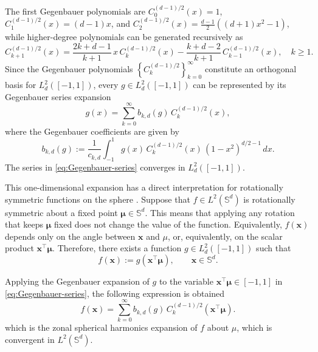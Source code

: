 \documentclass[12pt]{report} %
\newcommand{\bx}{\mathbf{x}}
\newcommand{\bmu}{\boldsymbol{\mu}}
\begin{document}
The first Gegenbauer polynomials are $C_0^{(d-1)/2}(x) = 1$, $C_1^{(d-1)/2}(x) = (d - 1)x$, and $C_2^{(d-1)/2}(x) = \frac{d - 1}{2}\left((d + 1)x^2 - 1\right)$, while higher-degree polynomials can be generated recursively as \citep[Section~18.9]{NIST:DLMF}
\begin{equation*}
C_{k+1}^{(d-1) / 2}(x)=\frac{2 k+d-1}{k+1} 
\, x \, C_k^{(d-1) / 2}(x)-\frac{k+d-2}{k+1} \, C_{k-1}^{(d-1) / 2}(x), \quad k \geq 1 .
\end{equation*}
Since the Gegenbauer polynomials $\left\{C_k^{(d-1)/2}\right\}_{k=0}^{\infty}$ constitute an orthogonal basis for $L_d^2([-1,1])$, every $g \in L_d^2([-1,1])$ can be represented by its Gegenbauer series expansion
\begin{equation}
    \label{eq:Gegenbauer-series}
    g(x) = \sum_{k=0}^{\infty} b_{k,d}(g) \, C_k^{(d-1)/2}(x),
\end{equation}
where the Gegenbauer coefficients are given by
\begin{equation}
    \label{eq:gegenbauer_coeff}
    b_{k,d}(g)
    :=
    \frac{1}{c_{k,d}}
    \int_{-1}^{1}
    g(x) \, C_k^{(d-1)/2}(x)\,(1 - x^2)^{d/2 - 1}\,dx.
\end{equation}
The series  in \eqref{eq:Gegenbauer-series} converges in $L_d^2([-1,1])$.

This one-dimensional expansion has a direct interpretation for rotationally symmetric functions on the sphere \citep{Garcia-Portugues2026}. Suppose that $f \in L^2(\mathbb{S}^d)$ is rotationally symmetric about a fixed point $\bmu \in \mathbb{S}^d$. This means that applying any rotation that keeps $\bmu$ fixed does not change the value of the function. Equivalently, $f(\bx)$ depends only on the angle between $\bx$ and $\mu$, or, equivalently, on the scalar product $\bx^\top \bmu$. Therefore, there exists a function $g \in L_d^2([-1,1])$ such that
\begin{equation*}
    f(\bx) := g(\bx^\top \bmu),
    \qquad \bx \in \mathbb{S}^d.
\end{equation*}

Applying the Gegenbauer expansion of $g$ to the variable $\bx^\top \bmu \in [-1,1]$ in \eqref{eq:Gegenbauer-series}, the following expression is obtained
\begin{equation}
    \label{eq:spherical-harmonics}
    f(\bx) = \sum_{k=0}^{\infty}
    b_{k,d}(g) \, C_k^{(d-1)/2}(\bx^\top \bmu).
\end{equation}
which is the zonal spherical harmonics expansion of $f$ about $\mu$, which is convergent in $L^2(\mathbb{S}^d)$. 
\end{document}
